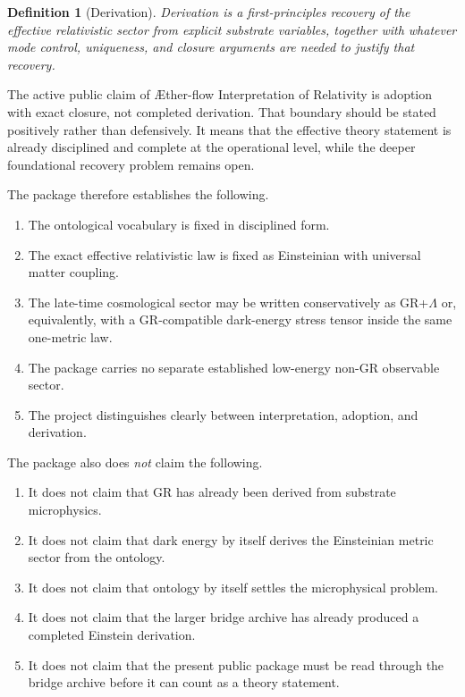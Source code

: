 \documentclass[11pt]{article}
\newcommand{\Aflow}{\AE{}ther-flow}
\newcommand{\TheoryName}{\Aflow{} Interpretation of Relativity}
\newtheorem{definition}{Definition}
\begin{document}
\begin{definition}[Derivation]
Derivation is a first-principles recovery of the effective relativistic sector from explicit substrate variables, together with whatever mode control, uniqueness, and closure arguments are needed to justify that recovery.
\end{definition}

The active public claim of \TheoryName{} is adoption with exact closure, not completed derivation. That boundary should be stated positively rather than defensively. It means that the effective theory statement is already disciplined and complete at the operational level, while the deeper foundational recovery problem remains open.

The package therefore establishes the following.
\begin{enumerate}
    \item The ontological vocabulary is fixed in disciplined form.
    \item The exact effective relativistic law is fixed as Einsteinian with universal matter coupling.
    \item The late-time cosmological sector may be written conservatively as GR+\(\Lambda\) or, equivalently, with a GR-compatible dark-energy stress tensor inside the same one-metric law.
    \item The package carries no separate established low-energy non-GR observable sector.
    \item The project distinguishes clearly between interpretation, adoption, and derivation.
\end{enumerate}

The package also does \emph{not} claim the following.
\begin{enumerate}
    \item It does not claim that GR has already been derived from substrate microphysics.
    \item It does not claim that dark energy by itself derives the Einsteinian metric sector from the ontology.
    \item It does not claim that ontology by itself settles the microphysical problem.
    \item It does not claim that the larger bridge archive has already produced a completed Einstein derivation.
    \item It does not claim that the present public package must be read through the bridge archive before it can count as a theory statement.
\end{enumerate}
\end{document}
